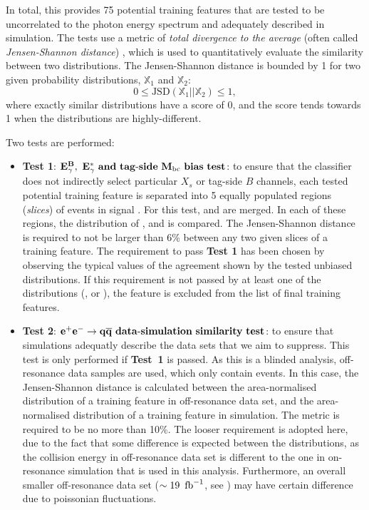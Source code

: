 In total, this provides 75 potential training features that are tested to be uncorrelated to the photon energy spectrum and adequately described in simulation.
The tests use a metric of \textit{total divergence to the average} (often called \textit{Jensen-Shannon distance}) \cite{Lin:1991abc},
which is used to quantitatively evaluate the similarity between two distributions.
The Jensen-Shannon distance is bounded by 1 for two given probability distributions, $\mathbb{X}_1$ and $\mathbb{X}_2$:
\begin{equation}\label{eq:js_distance}
    0\leq\mathrm{JSD}(\mathbb{X}_1||\mathbb{X}_2) \leq1,
\end{equation}
where exactly similar distributions have a score of 0, and the score tends towards 1 when the distributions are highly-different.

Two tests are performed:
\begin{itemize}
    \item \textbf{Test 1}: $\mathbf{{E^B_{\gamma}},~{E^*_{\gamma}}~and~tag\mbox{-}side~{M_{\mathrm{bc}}}~bias~test}$:
    to ensure that the classifier does not indirectly select particular $X_s$ or tag-side $B$ channels,
    each tested potential training feature is separated into 5 equally populated regions (\textit{slices}) of \BtoXsgamma events in signal \MC.
    For this test, \BptoXsgamma and \BztoXsgamma are merged.
    In each of these regions, the distribution of \EB, \Estar and \Mbc is compared.
    The Jensen-Shannon distance is required to not be larger than 6\% between any two given slices of a training feature.
    The requirement to pass \textbf{Test 1} has been chosen by observing the typical values of the agreement shown by the tested unbiased distributions.
    If this requirement is not passed by at least one of the distributions (\EB, \Estar or \Mbc), the feature is excluded from the list of final \BDT training features.
    \item \textbf{Test 2}: $\mathbf{e^+e^-\rightarrow q\overline q~data\mbox{-}simulation~similarity~test}$:
    to ensure that simulations adequatly describe the data sets that we aim to suppress.
    This test is only performed if \textbf{Test~1} is passed.
    As this is a blinded analysis, off-resonance data samples are used, which only contain \epem\ra\qqbar events.
    In this case, the Jensen-Shannon distance is calculated between 
    the area-normalised distribution of a training feature in off-resonance data set,
    and the area-normalised distribution of a training feature in \epem\ra\qqbar simulation.
    The metric is required to be no more than 10\%.
    The looser requirement is adopted here, due to the fact that some difference is expected between the distributions,
    as the collision energy in off-resonance data set is different to the one in on-resonance simulation that is used in this analysis.
    Furthermore, an overall smaller off-resonance data set ($\sim19~\mbox{\,fb}^{-1}$, see ) may have certain difference due to poissonian fluctuations.
\end{itemize}

